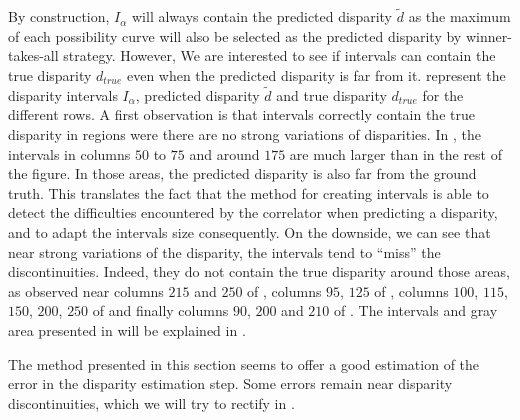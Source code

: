 By construction, $I_\alpha$ will always contain the predicted disparity $\tilde{d}$ as the maximum of each possibility curve will also be selected as the predicted disparity by winner-takes-all strategy. However, We are interested to see if intervals can contain the true disparity $d_{true}$ even when the predicted disparity is far from it.  represent the disparity intervals $I_\alpha$, predicted disparity $\tilde{d}$ and true disparity $d_{true}$ for the different rows. A first observation is that intervals correctly contain the true disparity in regions were there are no strong variations of disparities. In  , the intervals in columns $50$ to $75$ and around $175$ are much larger than in the rest of the figure. In those areas, the predicted disparity is also far from the ground truth. This translates the fact that the method for creating intervals is able to detect the difficulties encountered by the correlator when predicting a disparity, and to adapt the intervals size consequently. On the downside, we can see that near strong variations of the disparity, the intervals tend to ``miss'' the discontinuities. Indeed, they do not contain the true disparity around those areas, as observed near columns $215$ and $250$ of , columns $95$, $125$ of , columns $100$, $115$, $150$, $200$, $250$ of  
and finally columns $90$, $200$ and $210$ of . The intervals and gray area presented in  will be explained in .

The method presented in this section seems to offer a good estimation of the error in the disparity estimation step. Some errors remain near disparity discontinuities, which we will try to rectify in .

